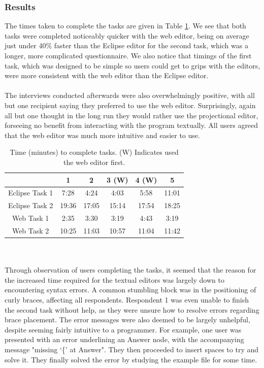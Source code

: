 \documentclass{article}
\begin{document}
{\subsubsection{Results}
The times taken to complete the tasks are given in Table \ref{Tab:questionnaireResults}. We see that both tasks were completed noticeably quicker with the web editor, being on average just under 40\% faster than the Eclipse editor for the second task, which was a longer, more complicated questionnaire. We also notice that timings of the first task, which was designed to be simple so users could get to grips with the editors, were more consistent with the web editor than the Eclipse editor.
\\
\\
The interviews conducted afterwards were also overwhelmingly positive, with all but one recipient saying they preferred to use the web editor. Surprisingly, again all but one thought in the long run they would rather use the projectional editor, forseeing no benefit from interacting with the program textually. All users agreed that the web editor was much more intuitive and easier to use.
\begin{table}[ht]
\centering
	\begin{tabular}{| c | c | c | c | c | c |}
	\hline
	& 1  & 2 & 3 (W) & 4 (W) & 5 \\
	\hline 
	Eclipse Task 1 & 7:28 & 4:24 & 4:03 & 5:58 & 11:01 \\
	Eclipse Task 2 & 19:36 & 17:05 & 15:14 & 17:54 & 18:25 \\
	Web Task 1 & 2:35 & 3:30 & 3:19 & 4:43 & 3:19 \\
	Web Task 2 & 10:25 & 11:03 & 10:57 & 11:04 & 11:42 \\
	\hline
	\end{tabular}
	\caption{Time (minutes) to complete tasks. (W) Indicates used the web editor first.}
	\label{Tab:questionnaireResults}
\end{table}
\\
\\
Through observation of users completing the tasks, it seemed that the reason for the increased time required for the textual editors was largely down to encountering syntax errors. A common stumbling block was in the positioning of curly braces, affecting all respondents. Respondent 1 was even unable to finish the second task without help, as they were unsure how to resolve errors regarding brace placement. The error messages were also deemed to be largely unhelpful, despite seeming fairly intuitive to a programmer. For example, one user was presented with an error underlining an Answer node, with the accompanying message "missing `\{' at Answer". They then proceeded to insert spaces to try and solve it. They finally solved the error by studying the example file for some time. 
}
\end{document}
